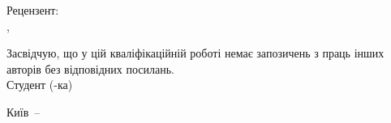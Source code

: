 \medskip
\noindent Рецензент:\\
\reviewerRegalia,\\
\reviewerFullName \hfill \hrulefill

\vspace{2em}
\noindent Засвідчую, що у цій кваліфікаційній роботі немає
запозичень з праць інших авторів без відповідних посилань.\\
Студент (-ка) \hrulefill

\vfill
\begin{center}
  Київ~--~\thesisYear
\end{center}

\clearpage
